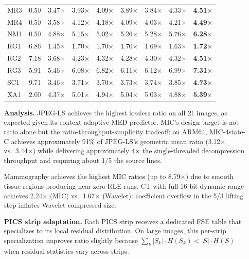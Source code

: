 \documentclass[journal]{IEEEtran}
\begin{document}
\begin{table}[t]
\begin{tabular}{lrrrrrrrr}
MR3  & 0.50 & 3.47$\times$ & 3.93$\times$ & 4.09$\times$ & 3.89$\times$ & 3.84$\times$ & 4.33$\times$ & \textbf{4.51$\times$} \\
MR4  & 0.50 & 3.58$\times$ & 4.12$\times$ & 4.18$\times$ & 4.09$\times$ & 4.03$\times$ & 4.21$\times$ & \textbf{4.49$\times$} \\
NM1  & 0.50 & 4.88$\times$ & 5.15$\times$ & 5.02$\times$ & 5.26$\times$ & 5.28$\times$ & 5.76$\times$ & \textbf{6.28$\times$} \\
RG1  & 6.86 & 1.45$\times$ & 1.70$\times$ & 1.70$\times$ & 1.70$\times$ & 1.69$\times$ & 1.63$\times$ & \textbf{1.72$\times$} \\
RG2  & 7.18 & 3.68$\times$ & 4.23$\times$ & 4.32$\times$ & 4.28$\times$ & 4.30$\times$ & 4.32$\times$ & \textbf{4.51$\times$} \\
RG3  & 5.91 & 5.46$\times$ & 6.08$\times$ & 6.82$\times$ & 6.11$\times$ & 6.12$\times$ & 6.99$\times$ & \textbf{7.31$\times$} \\
SC1  & 9.71 & 3.46$\times$ & 3.71$\times$ & 3.70$\times$ & 3.73$\times$ & 3.74$\times$ & 3.85$\times$ & \textbf{4.73$\times$} \\
XA1  & 2.00 & 4.37$\times$ & 5.01$\times$ & 4.94$\times$ & 5.04$\times$ & 5.03$\times$ & 4.88$\times$ & \textbf{5.39$\times$} \\
\bottomrule
\end{tabular}
\end{table}


\textbf{Analysis.} JPEG-LS achieves the highest lossless ratio on all 21
images, as expected given its context-adaptive MED predictor. MIC's design
target is not ratio alone but the ratio-throughput-simplicity tradeoff: on
ARM64, MIC-4state-C achieves approximately 91\% of JPEG-LS's geometric mean
ratio (3.12$\times$ vs.\ 3.44$\times$) while delivering approximately
4$\times$ the single-threaded decompression throughput and requiring about
1/5 the source lines.

Mammography achieves the highest MIC ratios (up to 8.79$\times$) due to smooth
tissue regions producing near-zero RLE runs. CT with full 16-bit dynamic range
achieves 2.24$\times$ (MIC) vs.\ 1.67$\times$ (Wavelet): coefficient overflow
in the 5/3 lifting step inflates Wavelet compressed size.

\textbf{PICS strip adaptation.} Each PICS strip receives a dedicated FSE table
that specializes to its local residual distribution. On large images, this
per-strip specialization improves ratio slightly because
$\sum_k |S_k| \cdot H(S_k) < |S| \cdot H(S)$ when residual statistics vary
across strips.
\end{document}
